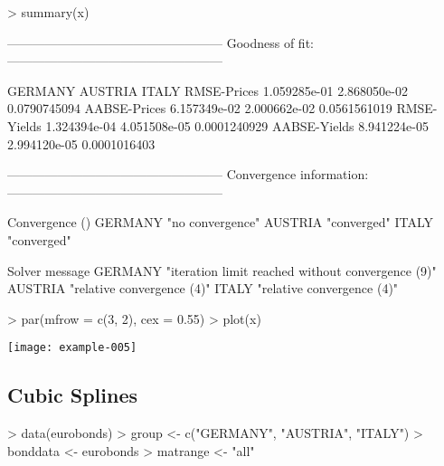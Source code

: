\begin{Schunk}
\begin{Sinput}
> summary(x)
\end{Sinput}
\begin{Soutput}
---------------------------------------------------
Goodness of fit:
---------------------------------------------------

                  GERMANY      AUSTRIA        ITALY
RMSE-Prices  1.059285e-01 2.868050e-02 0.0790745094
AABSE-Prices 6.157349e-02 2.000662e-02 0.0561561019
RMSE-Yields  1.324394e-04 4.051508e-05 0.0001240929
AABSE-Yields 8.941224e-05 2.994120e-05 0.0001016403


---------------------------------------------------
Convergence information:
---------------------------------------------------

        Convergence ()  
GERMANY "no convergence"
AUSTRIA "converged"     
ITALY   "converged"     

        Solver message                                   
GERMANY "iteration limit reached without convergence (9)"
AUSTRIA "relative convergence (4)"                       
ITALY   "relative convergence (4)"                       
\end{Soutput}
\end{Schunk}

\begin{center}
\begin{Schunk}
\begin{Sinput}
> par(mfrow = c(3, 2), cex = 0.55)
> plot(x)
\end{Sinput}
\end{Schunk}
\texttt{[image: example-005]}
\end{center}

\subsection{Cubic Splines}

\begin{Schunk}
\begin{Sinput}
> data(eurobonds)
> group <- c("GERMANY", "AUSTRIA", "ITALY")
> bonddata <- eurobonds
> matrange <- "all"
\end{Sinput}
\end{Schunk}

